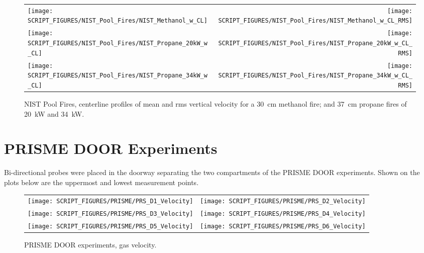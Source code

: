 \begin{figure}[p]
\begin{tabular*}{\textwidth}{l@{\extracolsep{\fill}}r}
\texttt{[image: SCRIPT\_FIGURES/NIST\_Pool\_Fires/NIST\_Methanol\_w\_CL]} &
\texttt{[image: SCRIPT\_FIGURES/NIST\_Pool\_Fires/NIST\_Methanol\_w\_CL\_RMS]} \\
\texttt{[image: SCRIPT\_FIGURES/NIST\_Pool\_Fires/NIST\_Propane\_20kW\_w\_CL]} &
\texttt{[image: SCRIPT\_FIGURES/NIST\_Pool\_Fires/NIST\_Propane\_20kW\_w\_CL\_RMS]} \\
\texttt{[image: SCRIPT\_FIGURES/NIST\_Pool\_Fires/NIST\_Propane\_34kW\_w\_CL]} &
\texttt{[image: SCRIPT\_FIGURES/NIST\_Pool\_Fires/NIST\_Propane\_34kW\_w\_CL\_RMS]} 
\end{tabular*}
\caption[NIST Pool Fires, centerline velocity]{NIST Pool Fires, centerline profiles of mean and rms vertical velocity for a 30~cm methanol fire; and 37~cm propane fires of 20~kW and 34~kW.}
\label{NIST_Pool_Fires_Velocity_2}
\end{figure}


\clearpage

\section{PRISME DOOR Experiments}

Bi-directional probes were placed in the doorway separating the two compartments of the PRISME DOOR experiments. Shown on the plots below are the uppermost and lowest measurement points.

\begin{figure}[!ht]
\begin{tabular*}{\textwidth}{l@{\extracolsep{\fill}}r}
\texttt{[image: SCRIPT\_FIGURES/PRISME/PRS\_D1\_Velocity]} &
\texttt{[image: SCRIPT\_FIGURES/PRISME/PRS\_D2\_Velocity]} \\
\texttt{[image: SCRIPT\_FIGURES/PRISME/PRS\_D3\_Velocity]} &
\texttt{[image: SCRIPT\_FIGURES/PRISME/PRS\_D4\_Velocity]} \\
\texttt{[image: SCRIPT\_FIGURES/PRISME/PRS\_D5\_Velocity]} &
\texttt{[image: SCRIPT\_FIGURES/PRISME/PRS\_D6\_Velocity]}
\end{tabular*}
\caption[PRISME DOOR experiments, gas velocity]{PRISME DOOR experiments, gas velocity.}
\label{PRISME_Velocity}
\end{figure}

\clearpage

